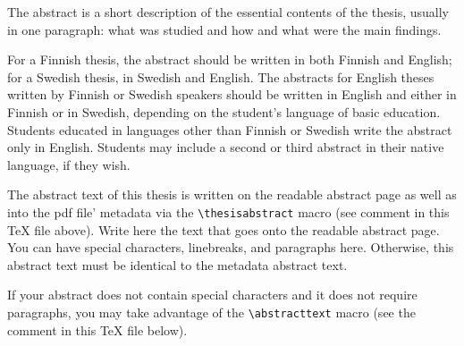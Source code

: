 \documentclass[english, 12pt, a4paper, elec, utf8, a-2b, online]{aaltothesis}
\date{21 September 2023}
\begin{document}
\makecoverpage

\makecopyrightpage

\clearpage

\begin{abstractpage}[english]
  The abstract is a short description of the essential contents of the thesis,
  usually in one paragraph: what was studied and how and what were the main
  findings.

  For a Finnish thesis, the abstract should be written in both Finnish and
  English; for a Swedish thesis, in Swedish and English. The abstracts for
  English theses written by Finnish or Swedish speakers should be written in
  English and either in Finnish or in Swedish, depending on the student’s
  language of basic education. Students educated in languages other than Finnish
  or Swedish write the abstract only in English. Students may include a second
  or third abstract in their native language, if they wish.

  The abstract text of this thesis is written on the readable abstract page as
  well as into the pdf file’ metadata via the \verb+\thesisabstract+ macro
  (see comment in this \TeX{} file above). Write here the text that goes onto
  the readable abstract page. You can have special characters, linebreaks, and
  paragraphs here. Otherwise, this abstract text must be identical to the
  metadata abstract text.

  If your abstract does not contain special characters and it does not require
  paragraphs, you may take advantage of the \verb+\abstracttext+ macro (see the
  comment in this \TeX{} file below).
\end{abstractpage}
\end{document}
